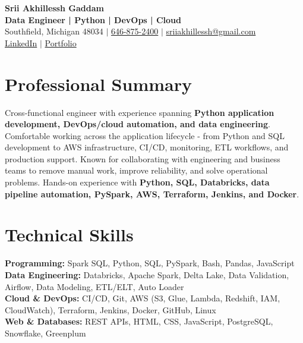 \documentclass[letterpaper,10pt]{article}
\begin{document}
\fontsize{9.35pt}{10.45pt}\selectfont

\begin{center}
    {\LARGE \textbf{Srii Akhillessh Gaddam}} \\[-1pt]
    \textbf{Data Engineer | Python | DevOps | Cloud} \\[2pt]
    Southfield, Michigan 48034 $|$
    \href{tel:6468752400}{646-875-2400} $|$
    \href{mailto:sriiakhillessh@gmail.com}{sriiakhillessh@gmail.com} \\[1pt]
    \href{https://www.linkedin.com/in/srii-akhiilessh-gaddam-b48668191/}{LinkedIn} $|$
    \href{https://sriiakhillesshg.github.io/portfolio/}{Portfolio}
\end{center}
\vspace{-8pt}

\section{Professional Summary}
\small{Cross-functional engineer with experience spanning \textbf{Python application development, DevOps/cloud automation, and data engineering}. Comfortable working across the application lifecycle - from Python and SQL development to AWS infrastructure, CI/CD, monitoring, ETL workflows, and production support. Known for collaborating with engineering and business teams to remove manual work, improve reliability, and solve operational problems. Hands-on experience with \textbf{Python, SQL, Databricks, data pipeline automation, PySpark, AWS, Terraform, Jenkins, and Docker}.}

\section{Technical Skills}
\small{
\textbf{Programming:} Spark SQL, Python, SQL, PySpark, Bash, Pandas, JavaScript \\
\textbf{Data Engineering:} Databricks, Apache Spark, Delta Lake, Data Validation, Airflow, Data Modeling, ETL/ELT, Auto Loader \\
\textbf{Cloud \& DevOps:} CI/CD, Git, AWS (S3, Glue, Lambda, Redshift, IAM, CloudWatch), Terraform, Jenkins, Docker, GitHub, Linux \\
\textbf{Web \& Databases:} REST APIs, HTML, CSS, JavaScript, PostgreSQL, Snowflake, Greenplum
}

\end{document}
